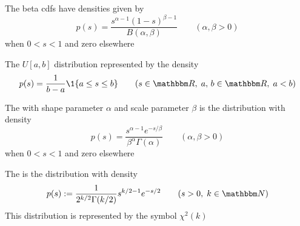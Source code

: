 \begin{frame}

    \vspace{2em}
    \Eg
    The beta {\sc cdf}s  have densities given by 
    \begin{equation*}
        p(s) = \frac{s^{\alpha-1} (1-s)^{\beta-1}}{B(\alpha, \beta)}
            \qquad (\alpha, \beta > 0)
    \end{equation*}
    when $0 < s < 1$ and zero elsewhere

\end{frame}


\begin{frame}

    \vspace{2em}
    \Eg
    The $U[a, b]$ distribution represented
    by the density
    \begin{equation*}
        p(s) = \frac{1}{b - a} \1\{a \leq s \leq b\}
        \qquad (s \in \RR, \; a, \, b \in \RR, \; a < b)
    \end{equation*}
    
\end{frame}


\begin{frame}

    \vspace{2em}
    \Eg
    The  with shape parameter $\alpha$ and scale
    parameter $\beta$ is the distribution with density
    \begin{equation*}
        p(s) = 
        \frac{s^{\alpha-1} e^{-s/\beta}}{\beta^{\alpha} \Gamma(\alpha)} 
            \qquad (\alpha, \beta > 0)
    \end{equation*}
    when $0 < s < 1$ and zero elsewhere
    
\end{frame}


\begin{frame}

    \vspace{2em}
    \Eg
    The 
    is the distribution with density
    \begin{equation*}
        p(s) := \frac{1}{2^{k/2} \Gamma(k/2)} s^{k/2 - 1} e^{-s/2} 
        \qquad (s > 0,\; k \in \NN)
    \end{equation*}
    This distribution is represented by the symbol $\chi^2(k)$
    
\end{frame}

